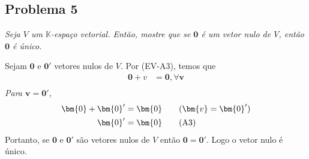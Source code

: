 \subsection*{Problema 5}
  \textit{Seja  $V$  um $\mathbb{K}$-espaço  vetorial.  Então,  mostre que  se
  $\bm{0}$ é um vetor nulo de $V$, então $\bm{0}$ é único.}

Sejam $\bm{0}$ e $\bm{0}'$ vetores nulos de $V$. Por (EV-A3), temos que
\begin{align*}
    \bm{0} + v &= \bm{0}, \forall \bm{v}\\
\end{align*}
\textit{Para $\bm{v} = \bm{0}'$,} \\
\begin{align*}
    \bm{0} + \bm{0}' &= \bm{0} \tag{$\bm{v} = \bm{0}'$}\\
    \bm{0}' &= \bm{0} \tag{A3}
\end{align*}
Portanto, se $\bm{0}$ e $\bm{0}'$ são vetores nulos de $V$ então $\bm{0} = \bm{0}'$. Logo o vetor nulo é único.
